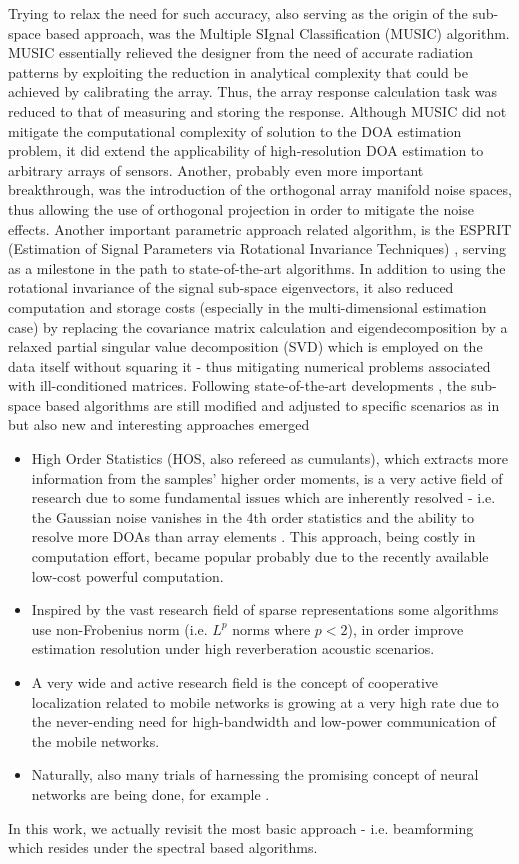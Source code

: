 Trying to relax the need for such accuracy, also serving as the origin of the sub-space based approach, was the Multiple SIgnal Classification (MUSIC) \cite{schmidt1986multiple} algorithm.
MUSIC essentially relieved the designer from the need of accurate radiation patterns by exploiting the reduction in analytical complexity that could be achieved by calibrating the array.
Thus, the array response calculation task was reduced to that of measuring and storing the response. 
Although MUSIC did not mitigate the computational complexity of solution to the DOA estimation problem, it did extend the applicability of high-resolution DOA estimation to arbitrary arrays of sensors.
Another, probably even more important breakthrough, was the introduction of the orthogonal array manifold noise spaces, thus allowing the use of orthogonal projection in order to mitigate the noise effects.
Another important parametric approach related algorithm, is the ESPRIT (Estimation of Signal Parameters via Rotational Invariance Techniques) \cite{ESPRIT}, serving as a milestone in the path to state-of-the-art algorithms.
In addition to using the rotational invariance of the signal sub-space eigenvectors, it also reduced computation and storage costs (especially in the multi-dimensional estimation case) by replacing the covariance matrix calculation and eigendecomposition by a relaxed partial singular value decomposition (SVD) which is employed on the data itself without squaring it - thus mitigating numerical problems associated with ill-conditioned matrices.
Following state-of-the-art developments \cite{BOOK-classicalAndModernDOA}, the sub-space based algorithms are still modified and adjusted to specific scenarios as in \cite{LpNorm MUSIC} but also new and interesting approaches emerged
\begin{itemize}
    \item High Order Statistics (HOS, also refereed as cumulants), which extracts more information from the samples' higher order moments, is a very active field of research due to some fundamental issues which are inherently resolved - i.e. the Gaussian noise vanishes in the 4th order statistics and the ability to resolve more DOAs than array elements \cite{chevalier2006high}.
    This approach, being costly in computation effort, became popular probably due to the recently available low-cost powerful computation.
    \item Inspired by the vast research field of sparse representations some algorithms \cite{nadiri2014localization} use non-Frobenius norm (i.e. $L^{p}$ norms where $p<2$), in order improve estimation resolution under high reverberation acoustic scenarios.
    \item A very wide and active research field is the concept of cooperative localization related to mobile networks is growing at a very high rate due to the never-ending need for high-bandwidth and low-power communication of the mobile networks.
    \item Naturally, also many trials of harnessing the promising concept of neural networks are being done, for example \cite{shareef2008localization}.
\end{itemize}
In this work, we actually revisit the most basic approach - i.e. beamforming which resides under the spectral based algorithms.